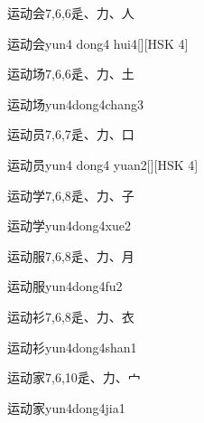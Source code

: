 \begin{Entry}{运动会}{7,6,6}{⾡、⼒、⼈}
  \begin{Phonetics}{运动会}{yun4 dong4 hui4}[][HSK 4]
  \end{Phonetics}
\end{Entry}

\begin{Entry}{运动场}{7,6,6}{⾡、⼒、⼟}
  \begin{Phonetics}{运动场}{yun4dong4chang3}
  \end{Phonetics}
\end{Entry}

\begin{Entry}{运动员}{7,6,7}{⾡、⼒、⼝}
  \begin{Phonetics}{运动员}{yun4 dong4 yuan2}[][HSK 4]
  \end{Phonetics}
\end{Entry}

\begin{Entry}{运动学}{7,6,8}{⾡、⼒、⼦}
  \begin{Phonetics}{运动学}{yun4dong4xue2}
  \end{Phonetics}
\end{Entry}

\begin{Entry}{运动服}{7,6,8}{⾡、⼒、⽉}
  \begin{Phonetics}{运动服}{yun4dong4fu2}
  \end{Phonetics}
\end{Entry}

\begin{Entry}{运动衫}{7,6,8}{⾡、⼒、⾐}
  \begin{Phonetics}{运动衫}{yun4dong4shan1}
  \end{Phonetics}
\end{Entry}

\begin{Entry}{运动家}{7,6,10}{⾡、⼒、⼧}
  \begin{Phonetics}{运动家}{yun4dong4jia1}
  \end{Phonetics}
\end{Entry}

